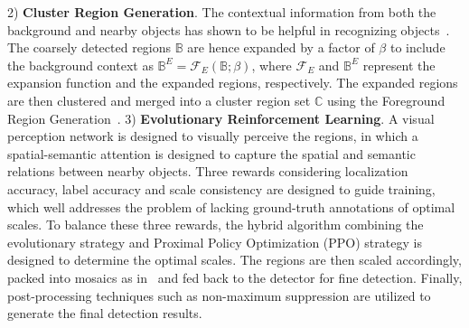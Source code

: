 \documentclass[letterpaper]{article} %
\newcommand\blue[1]{\textcolor{blue}{#1}}
\newcommand\rjf[1]{\textcolor{red}{\{RJF: #1\}}}
\newcommand\yxy[1]{\textcolor{blue}{\{YXY: #1\}}}
\newcommand\qz[1]{\textcolor{blue}{\{QZ: #1\}}}
\begin{document}
2) %
\textbf{Cluster Region Generation}. %
The contextual information from both the background and nearby objects has shown to be helpful in recognizing objects~\cite{%
Zhang_2022_Spatial, Zhang_2023_Spatial}. The coarsely detected regions $\mathbb{B}$ are hence expanded by a factor of $\beta$ to include the background context as $\mathbb{B}^{E} = \mathcal{F}_{E}\left(\mathbb{B}; \beta \right)$,
where $\mathcal{F}_{E}$ and $\mathbb{B}^{E}$ represent the expansion function and the expanded regions, respectively.
The expanded regions are then clustered and merged into a cluster region set $\mathbb{C}$ using the Foreground Region Generation~\cite{Huang_2022_UFPMP}.
3) %
\textbf{Evolutionary Reinforcement Learning}. %
A visual perception network is designed to visually perceive the regions, in which a spatial-semantic attention is designed to capture the spatial and semantic relations between nearby objects. Three rewards considering localization accuracy, label accuracy and scale consistency are designed to guide training, which well addresses the problem of lacking ground-truth annotations of optimal scales. To balance these three rewards, the hybrid algorithm combining the evolutionary strategy and Proximal Policy Optimization (PPO) strategy is designed to determine the optimal scales. %
The regions are then scaled accordingly, packed into mosaics as in~\cite{Huang_2022_UFPMP} and fed back to the detector for fine detection. Finally, post-processing techniques such as non-maximum suppression are utilized to generate the final detection results.
\end{document}

